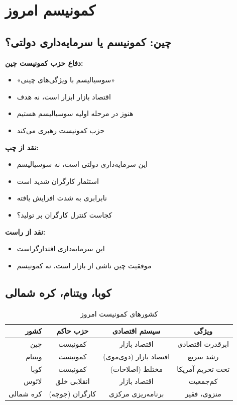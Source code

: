 \section{کمونیسم امروز}

\subsection{چین: کمونیسم یا سرمایه‌داری دولتی؟}

\begin{debatebox}
\textbf{دفاع حزب کمونیست چین:}
\begin{itemize}[nosep]
    \item «سوسیالیسم با ویژگی‌های چینی»
    \item اقتصاد بازار ابزار است، نه هدف
    \item هنوز در مرحله اولیه سوسیالیسم هستیم
    \item حزب کمونیست رهبری می‌کند
\end{itemize}

\textbf{نقد از چپ:}
\begin{itemize}[nosep]
    \item این سرمایه‌داری دولتی است، نه سوسیالیسم
    \item استثمار کارگران شدید است
    \item نابرابری به شدت افزایش یافته
    \item کجاست کنترل کارگران بر تولید؟
\end{itemize}

\textbf{نقد از راست:}
\begin{itemize}[nosep]
    \item این سرمایه‌داری اقتدارگراست
    \item موفقیت چین ناشی از بازار است، نه کمونیسم
\end{itemize}
\end{debatebox}

\subsection{کوبا، ویتنام، کره شمالی}

\begin{table}[thbp]
\centering
\caption{کشورهای کمونیست امروز}
\label{tab:communist-countries-today}
\begin{tabular}{r|c|c|c}
\toprule
\textbf{کشور} & \textbf{حزب حاکم} & \textbf{سیستم اقتصادی} & \textbf{ویژگی} \\
\midrule
چین & کمونیست & اقتصاد بازار & ابرقدرت اقتصادی \\
ویتنام & کمونیست & اقتصاد بازار (دوی‌موی) & رشد سریع \\
کوبا & کمونیست & مختلط (اصلاحات) & تحت تحریم آمریکا \\
لائوس & انقلابی خلق & اقتصاد بازار & کم‌جمعیت \\
کره شمالی & کارگران (جوچه) & برنامه‌ریزی مرکزی & منزوی، فقیر \\
\bottomrule
\end{tabular}
\end{table}


